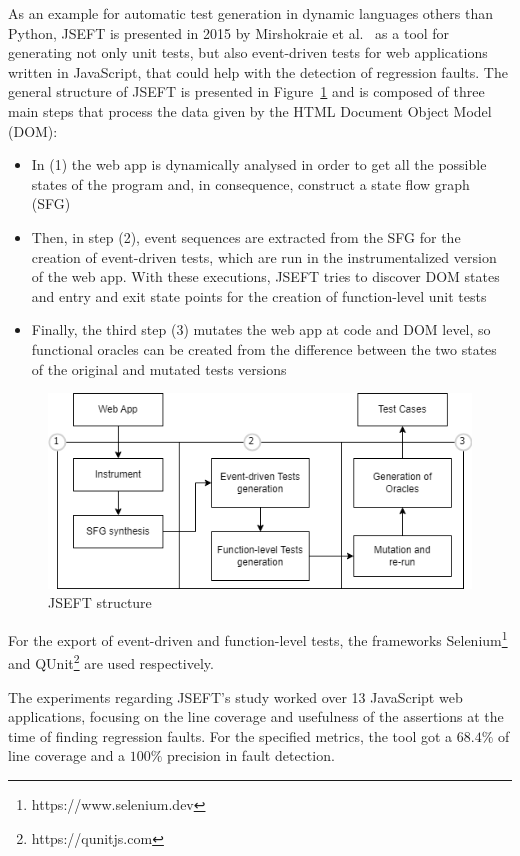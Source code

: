 \documentclass[%
  chapterprefix=false,%
  open=right,%
  twoside=true,%
  paper=a4,%
  logofile={Figures/logo.png},%
  thesistype=master,%
  UKenglish,%
]{se2thesis}
\begin{document}
As an example for automatic test generation in dynamic languages others than Python, JSEFT is presented in 2015 by Mirshokraie et al.~\cite{DBLP:conf/icst/Mirshokraie0P15} as a tool for generating not only unit tests, but also event-driven tests for web applications written in JavaScript, that could help with the detection of regression faults.
The general structure of JSEFT is presented in Figure~\ref{fig:jseft} and is composed of three main steps that process the data given by the HTML Document Object Model (DOM):
\begin{itemize}
  \item In (1) the web app is dynamically analysed in order to get all the possible states of the program and, in consequence, construct a state flow graph (SFG)
  \item Then, in step (2), event sequences are extracted from the SFG for the creation of event-driven tests, which are run in the instrumentalized version of the web app.
  With these executions, JSEFT tries to discover DOM states and entry and exit state points for the creation of function-level unit tests
  \item Finally, the third step (3) mutates the web app at code and DOM level, so functional oracles can be created from the difference between the two states of the original and mutated tests versions
\end{itemize}

\begin{figure}[tb]
  \centering 
  \includegraphics[width=.99\textwidth]{Figures/jseft2.png}
  \caption{JSEFT structure}\label{fig:jseft}
\end{figure}

For the export of event-driven and function-level tests, the frameworks Selenium\footnote{https://www.selenium.dev} and QUnit\footnote{https://qunitjs.com} are used respectively.

The experiments regarding JSEFT's study worked over 13 JavaScript web applications, focusing on the line coverage and usefulness of the assertions at the time of finding regression faults.
For the specified metrics, the tool got a \(68.4\%\) of line coverage and a \(100\%\) precision in fault detection.
\end{document}

